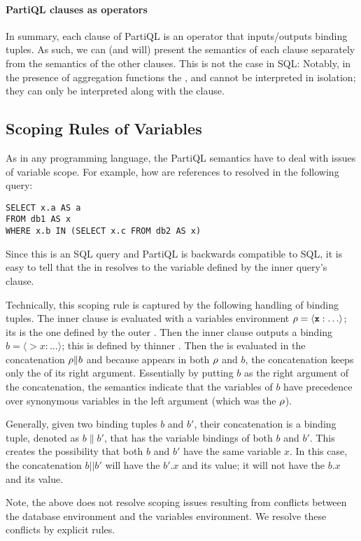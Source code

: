 \paragraph{PartiQL clauses as operators} 
In summary, each clause of PartiQL is an operator that inputs/outputs binding
tuples. As such, we can (and will) present the semantics of each clause
separately from the semantics of the other clauses. This is not the case in SQL:
Notably, in the presence of aggregation functions the , 
and  cannot be interpreted in isolation; they can only be interpreted
along with the  clause. 

\subsection{Scoping Rules of Variables} 
\label{sec:scoping-variables}

As in any programming language, the PartiQL semantics have to deal with issues
of variable scope. For example, how are references to  resolved in the
following query:

\begin{lstlisting}
SELECT x.a AS a
FROM db1 AS x
WHERE x.b IN (SELECT x.c FROM db2 AS x)
\end{lstlisting}

Since this is an SQL query and PartiQL is backwards compatible to SQL, it is
easy to tell that the  in  resolves to the variable  defined
by the inner query's  clause.

Technically, this scoping rule is captured by the following handling of binding
tuples. The inner  clause is evaluated with a variables environment
$\rho = \langle \texttt{\textbf{x}}: \ldots\rangle$; its  is the one defined by the
outer . Then the inner  clause outputs a binding $b = \langle
\gt{x}: \ldots\rangle$; this  is defined by thinner . Then the
 is evaluated in the concatenation $\rho \| b$ and because 
appears in both $\rho$ and $b$, the concatenation keeps only the  of its
right argument. Essentially by putting $b$ as the right argument of the
concatenation, the semantics indicate that the variables of $b$ have precedence
over synonymous variables in the left argument (which was the $\rho$).

Generally, given two binding tuples $b$ and $b'$, their concatenation is a
binding tuple, denoted as $b \| b'$, that has the variable bindings of both $b$
and $b'$. This creates the possibility that both $b$ and $b'$ have the same
variable $x$. In this case, the concatenation $b || b'$ will have the $b'.x$ and
its value; it will not have the $b.x$ and its value.

Note, the above does not resolve scoping issues resulting from conflicts between
the database environment and the variables environment. We resolve these
conflicts by explicit rules.
